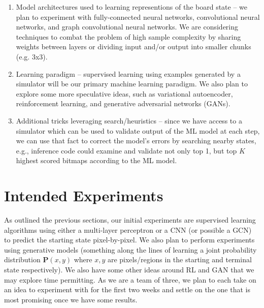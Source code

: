 \documentclass[conference]{IEEEtran}
\begin{document}
\begin{enumerate}
    \item Model architectures used to learning representions of the board state -- we plan to experiment with fully-connected neural networks, convolutional neural networks, and graph convolutional neural networks. We are considering techniques to combat the problem of high sample complexity by sharing weights between layers or dividing input and/or output into smaller chunks (e.g. 3x3).
    
    \item Learning paradigm -- supervised learning using examples generated by a simulator will be our primary machine learning paradigm. We also plan to explore some more speculative ideas, such as variational autoencoder, reinforcement learning, and generative adversarial networks (GANs).
    
    \item Additional tricks leveraging search/heuristics -- since we have access to a simulator which can be used to validate output of the ML model at each step, we can use that fact to correct the model's errors by searching nearby states, e.g., inference code could examine and validate not only top 1, but top $K$ highest scored bitmaps according to the ML model. 
    
    
\end{enumerate}

\section{Intended Experiments}

As outlined the previous sections, our initial experiments are supervised learning algorithms using either a multi-layer perceptron or a CNN (or possible a GCN) to predict the starting state pixel-by-pixel. We also plan to perform experiments using generative models (something along the lines of learning a joint probability distribution $\mathbf P(x, y)$ where $x, y$ are pixels/regions in the starting and terminal state respectively). We also have some other ideas around RL and GAN that we may explore time permitting. As we are a team of three, we plan to each take on an idea to experiment with for the first two weeks and settle on the one that is most promising once we have some results.
\end{document}
